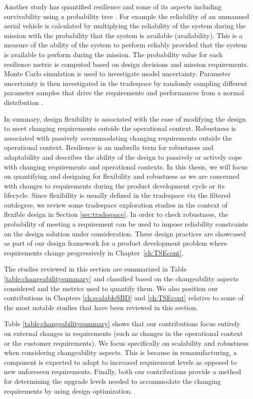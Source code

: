 Another study has quantified resilience and some of its aspects including survivability using a probability tree \cite{Small2019}. For example the reliability of an unmanned aerial vehicle is calculated by multiplying the reliability of the system during the mission with the probability that the system is available (availability). This is a measure of the ability of the system to perform reliably provided that the system is available to perform during the mission. The probability value for each resilience metric is computed based on design decisions and mission requirements. Monte Carlo simulation is used to investigate model uncertainty. Parameter uncertainty is then investigated in the tradespace by randomly sampling different parameter samples that drive the requirements and performances from a normal distribution \cite{Small2019}. 

In summary, design flexibility is associated with the ease of modifying the design to meet changing requirements outside the operational context. Robustness is associated with passively accommodating changing requirements outside the operational context. Resilience is an umbrella term for robustness and adaptability and describes the ability of the design to passively or actively cope with changing requirements and operational contexts. In this thesis, we will focus on quantifying and designing for flexibility and robustness as we are concerned with changes to requirements during the product development cycle or its lifecycle. Since flexibility is usually defined in the tradespace via the filtered outdegree, we review some tradespace exploration studies in the context of flexible design in Section \ref{sec:tradespace}. In order to check robustness, the probability of meeting a requirement can be used to impose reliability constraints on the design solution under consideration. These design practices are showcased as part of our design framework for a product development problem where requirements change progressively in Chapter~\ref{ch:TSEcont}.

The studies reviewed in this section are summarized in Table \ref{table:changeabilitysummary} and classified based on the changeability aspects considered and the metrics used to quantify them. We also position our contributions in Chapters \ref{ch:scalableSBD} and \ref{ch:TSEcont} relative to some of the most notable studies that have been reviewed in this section.

Table \ref{table:changeabilitysummary} shows that our contributions focus entirely on external changes in requirements (such as changes in the operational context or the customer requirements). We focus specifically on scalability and robustness when considering changeability aspects. This is because in remanufacturing, a component is expected to adapt to increased requirement levels as opposed to new unforeseen requirements. Finally, both our contributions provide a method for determining the upgrade levels needed to accommodate the changing requirements by using design optimization.


